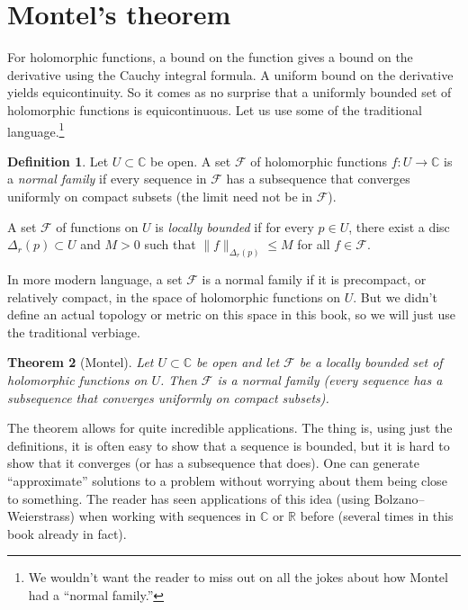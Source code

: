 \documentclass[12pt,openany]{book}
\newcommand{\snorm}[1]{\lVert {#1} \rVert}
\newcommand{\C}{{\mathbb{C}}}
\newcommand{\R}{{\mathbb{R}}}
\newcommand{\sF}{{\mathscr{F}}}
\newcommand{\myindex}[1]{#1\index{#1}}
\newcommand{\myquote}[1]{``#1''}
\theoremstyle{plain}
\newtheorem{thm}{Theorem}[section]
\theoremstyle{remark}
\theoremstyle{definition}
\newtheorem{defn}[thm]{Definition}
\theoremstyle{exercise}
\theoremstyle{example}
\begin{document}

\section{Montel's theorem}
\label{sec:montel}

For holomorphic functions, a bound on the function gives a
bound on the derivative using the Cauchy integral formula.  A uniform
bound on the derivative yields equicontinuity.
So it comes as no
surprise that a uniformly bounded set of holomorphic functions
is equicontinuous.
Let us use some of the traditional language.\footnote{%
We wouldn't want the reader to miss out on all the
jokes about how Montel had a \myquote{normal family.}}

\begin{defn}
Let $U \subset \C$ be open.
A set $\sF$ of holomorphic functions $f \colon U \to \C$ is a
\emph{\myindex{normal family}} if every sequence in $\sF$ has a subsequence
that converges uniformly on compact subsets (the limit need not be in $\sF$).

A set $\sF$ of functions on $U$ is \emph{\myindex{locally bounded}}
if for every $p \in U$, there exist a disc $\Delta_r(p) \subset U$ and $M > 0$
such that 
$\snorm{f}_{\Delta_r(p)} \leq M$ for all $f \in \sF$.
\end{defn}

In more modern language, a set $\sF$ is a normal family if it is precompact, or
relatively compact, in the space of holomorphic functions on $U$.  But we
didn't define an actual topology or metric on this space in this book, so
we will just use the traditional verbiage.

\begin{thm}[Montel]
Let $U \subset \C$ be open and let $\sF$
be a locally bounded set of holomorphic functions on $U$.
Then $\sF$ is a normal family (every sequence has a subsequence that
converges uniformly on compact subsets).
\end{thm}

The theorem allows for quite incredible applications.  The thing is,
using just the definitions, it is often easy to show that a sequence is bounded,
but it is hard to show that it converges (or has a subsequence that does).
One can generate \myquote{approximate} solutions to a problem without worrying
about them being close to something.
The reader has seen applications of this idea (using Bolzano--Weierstrass)
when working with sequences in $\C$ or $\R$ before (several times in this
book already in fact).
\end{document}
